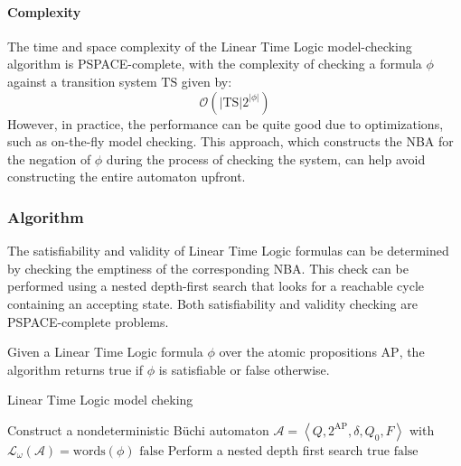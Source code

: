 \paragraph*{Complexity}
The time and space complexity of the Linear Time Logic model-checking algorithm is PSPACE-complete, with the complexity of checking a formula $\phi$ against a transition system $\text{TS}$ given by:
\[\mathcal{O}(\left\lvert \text{TS}\right\rvert 2^{\left\lvert \phi\right\rvert })\]
\noindent However, in practice, the performance can be quite good due to optimizations, such as on-the-fly model checking. 
This approach, which constructs the NBA for the negation of $\phi$ during the process of checking the system, can help avoid constructing the entire automaton upfront.

\subsubsection{Algorithm}
The satisfiability and validity of Linear Time Logic formulas can be determined by checking the emptiness of the corresponding NBA. 
This check can be performed using a nested depth-first search that looks for a reachable cycle containing an accepting state. 
Both satisfiability and validity checking are PSPACE-complete problems.

Given a Linear Time Logic formula $\phi$ over the atomic propositions $\text{AP}$, the algorithm returns true if $\phi$ is satisfiable or false otherwise.
\begin{algorithm}[H]
    \caption{Linear Time Logic model cheking}
        \begin{algorithmic}[1]
            \State Construct a nondeterministic Büchi automaton $\mathcal{A}=\left\langle Q,2^{\text{AP}},\delta,Q_0,F\right\rangle$ with $\mathcal{L}_{\omega}(\mathcal{A})=\text{words}(\phi)$
                \State \Return $\text{false}$
            \EndIf
            \Repeat
                \State Perform a nested depth first search
                    \State \Return $\text{true}$
                \EndIf 
            \State \Return $\text{false}$
        \end{algorithmic}
\end{algorithm}